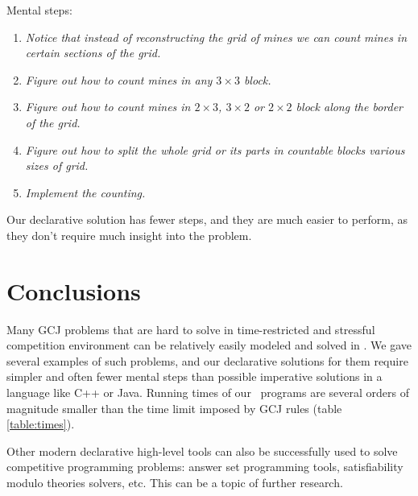 \documentclass{acm_proc_article-sp}
\begin{document}
Mental steps:

\begin{enumerate}
\item \textit{Notice that instead of reconstructing the grid of mines we can count mines in certain sections of the grid.}
\item \textit{Figure out how to count mines in any $3 \times 3$ block.}
\item \textit{Figure out how to count mines in $2 \times 3$, $3 \times 2$ or $2 \times 2$ block along the border of the grid.}
\item \textit{Figure out how to split the whole grid or its parts in countable blocks various sizes of grid.}
\item \textit{Implement the counting.}
\end{enumerate}

Our declarative solution has fewer steps, and they are much easier to perform, as they don't require much insight into the problem.

\section{Conclusions}

Many GCJ problems that are hard to solve in time-restricted and stressful competition environment can be relatively easily
modeled and solved in \eclipse. 
We gave several examples of such problems, and our declarative solutions for them require simpler and often fewer mental steps than possible imperative solutions in a language like C++ or Java.
Running times of our \eclipse\ programs are several orders of magnitude smaller than the time limit imposed by GCJ rules (table \ref{table:times}).

Other modern declarative high-level tools can also be successfully used to solve competitive programming problems:
answer set programming tools, satisfiability modulo theories solvers, etc. This can be a topic of further research.



\end{document}
